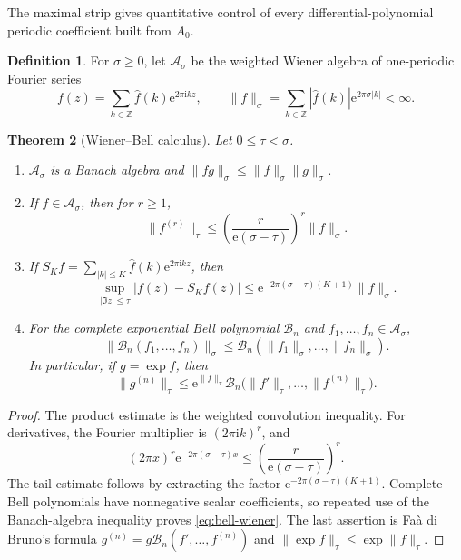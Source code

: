 \documentclass[11pt,oneside]{article}
\numberwithin{equation}{section}
\newtheorem{theorem}{Theorem}[section]
\theoremstyle{definition}
\newtheorem{definition}[theorem]{Definition}
\theoremstyle{remark}
\newcommand{\Z}{\mathbb Z}
\newcommand{\e}{\mathrm e}
\newcommand{\ii}{\mathrm i}
\newcommand{\Bell}{\mathcal B}
\newcommand{\Wiener}{\mathcal A}
\begin{document}
The maximal strip gives quantitative control of every differential-polynomial periodic
coefficient built from $A_0$.

\begin{definition}
For $\sigma\ge0$, let $\Wiener_\sigma$ be the weighted Wiener algebra of one-periodic
Fourier series
\[
 f(z)=\sum_{k\in\Z}\widehat f(k)\e^{2\pi\ii kz},
 \qquad
 \|f\|_\sigma=\sum_{k\in\Z}|\widehat f(k)|\e^{2\pi\sigma|k|}<\infty.
\]
\end{definition}

\begin{theorem}[Wiener--Bell calculus]
\label{thm:wiener-bell}
Let $0\le\tau<\sigma$.
\begin{enumerate}
\item $\Wiener_\sigma$ is a Banach algebra and
$\|fg\|_\sigma\le\|f\|_\sigma\|g\|_\sigma$.
\item If $f\in\Wiener_\sigma$, then for $r\ge1$,
\begin{equation}
 \|f^{(r)}\|_\tau
 \le\left(\frac{r}{\e(\sigma-\tau)}\right)^r\|f\|_\sigma.
 \label{eq:derivative-wiener}
\end{equation}
\item If $S_Kf=\sum_{|k|\le K}\widehat f(k)\e^{2\pi\ii kz}$, then
\begin{equation}
 \sup_{|\Im z|\le\tau}|f(z)-S_Kf(z)|
 \le\e^{-2\pi(\sigma-\tau)(K+1)}\|f\|_\sigma.
 \label{eq:fourier-tail-wiener}
\end{equation}
\item For the complete exponential Bell polynomial $\Bell_n$ and
$f_1,\ldots,f_n\in\Wiener_\sigma$,
\begin{equation}
 \|\Bell_n(f_1,\ldots,f_n)\|_\sigma
 \le\Bell_n(\|f_1\|_\sigma,\ldots,\|f_n\|_\sigma).
 \label{eq:bell-wiener}
\end{equation}
In particular, if $g=\exp f$, then
\begin{equation}
 \|g^{(n)}\|_\tau
 \le \e^{\|f\|_\tau}
 \Bell_n\bigl(\|f'\|_\tau,\ldots,\|f^{(n)}\|_\tau\bigr).
 \label{eq:exp-bell-bound}
\end{equation}
\end{enumerate}
\end{theorem}

\begin{proof}
The product estimate is the weighted convolution inequality.  For derivatives, the
Fourier multiplier is $(2\pi\ii k)^r$, and
\[
 (2\pi x)^r\e^{-2\pi(\sigma-\tau)x}
 \le\left(\frac{r}{\e(\sigma-\tau)}\right)^r.
\]
The tail estimate follows by extracting the factor
$\e^{-2\pi(\sigma-\tau)(K+1)}$.  Complete Bell polynomials have nonnegative scalar
coefficients, so repeated use of the Banach-algebra inequality proves
\eqref{eq:bell-wiener}.  The last assertion is Fa\`a di Bruno's formula
$g^{(n)}=g\Bell_n(f',\ldots,f^{(n)})$ and
$\|\exp f\|_\tau\le\exp\|f\|_\tau$.
\end{proof}
\end{document}
